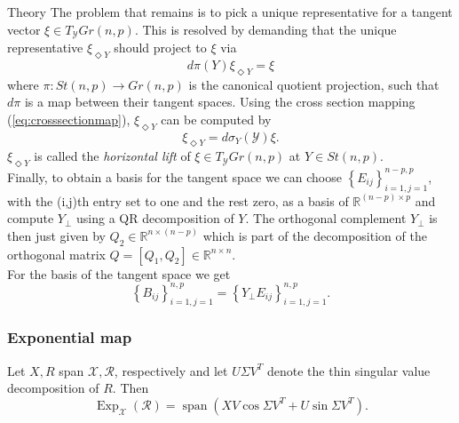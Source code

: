 \begin{chapter}{Theory}
The problem that remains is to pick a unique representative for a tangent vector $\xi\in T_{\mathcal{Y}}Gr(n,p)$.
This is resolved by demanding that the unique representative $\xi_{\Diamond Y}$ should project to $\xi$ via
\begin{equation}
d\pi(Y)\xi_{\Diamond Y}=\xi
\end{equation}
where $\pi: St(n,p)\to Gr(n,p)$ is the canonical quotient projection, such that $d\pi$ is a map between their 
tangent spaces. Using the cross section mapping (\ref{eq:crosssectionmap}), $\xi_{\Diamond Y}$ can be computed by
\begin{equation}
\xi_{\Diamond Y} = d\sigma_Y(\mathcal{Y})\xi.
\end{equation}
$\xi_{\Diamond Y}$ is called the \emph{horizontal lift} of $\xi\in T_{\mathcal{Y}}Gr(n,p)$ at $Y\in St(n,p)$.\\

Finally, to obtain a basis for the tangent space we can choose $\left\lbrace E_{ij}\right\rbrace_{i=1,j=1}^{n-p,p}$, with the (i,j)th entry set to one and the rest zero,
as a basis of $\mathbb{R}^{(n-p)\times p}$ and compute $Y_{\bot}$ using a QR decomposition of $Y$. The orthogonal complement $Y_{\bot}$ is then just given by 
$Q_2\in\mathbb{R}^{n\times (n-p)}$ which is part of the decomposition of the orthogonal matrix $Q=[Q_1,Q_2]\in\mathbb{R}^{n\times n}$.\\
For the basis of the tangent space we get 
\begin{equation}
    \left\lbrace B_{ij}\right\rbrace_{i=1,j=1}^{n,p}=\left\lbrace Y_{\bot}E_{ij}\right\rbrace_{i=1,j=1}^{n,p}.
\end{equation}


\subsubsection{Exponential map} %
\label{ssub:Exponential map}
Let $X, R$ span $\mathcal{X}, \mathcal{R}$, respectively and let $U\Sigma V^{T}$ denote the thin singular value decomposition of $R$. Then
\begin{equation}
    \operatorname{Exp}_{\mathcal{X}}(\mathcal{R})=\operatorname{span}\left( XV\cos\Sigma V^T + U\sin\Sigma V^T\right).
\end{equation}


\end{chapter}
